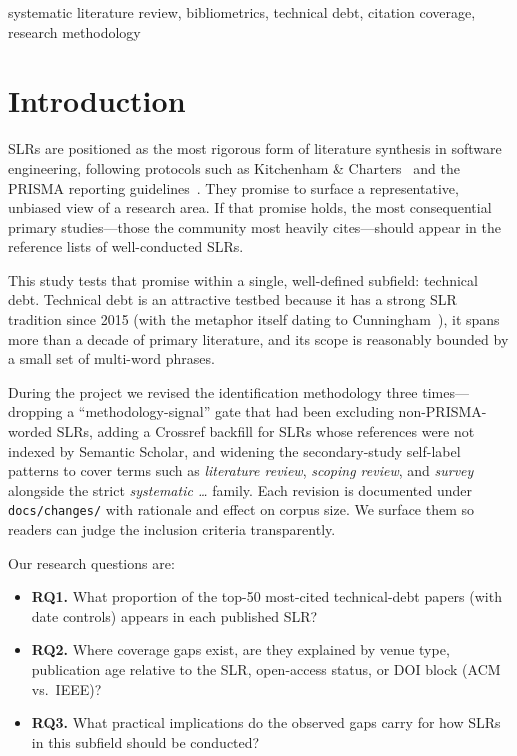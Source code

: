 \documentclass[conference]{IEEEtran}
\begin{document}
\begin{IEEEkeywords}
systematic literature review, bibliometrics, technical debt, citation
coverage, research methodology
\end{IEEEkeywords}

\section{Introduction}

SLRs are positioned as the most rigorous form of literature synthesis in
software engineering, following protocols such as Kitchenham \&
Charters~\cite{kitchenham2007guidelines} and the PRISMA reporting
guidelines~\cite{moher2009prisma}. They promise to surface a representative,
unbiased view of a research area. If that promise holds, the most
consequential primary studies---those the community most heavily
cites---should appear in the reference lists of well-conducted SLRs.

This study tests that promise within a single, well-defined subfield:
technical debt. Technical debt is an attractive testbed because it has a
strong SLR tradition since 2015 (with the metaphor itself dating to
Cunningham~\cite{cunningham1992wycash}), it spans more than a decade of
primary literature, and its scope is reasonably bounded by a small set of
multi-word phrases.

During the project we revised the identification methodology three
times---dropping a ``methodology-signal'' gate that had been excluding
non-PRISMA-worded SLRs, adding a Crossref backfill for SLRs whose
references were not indexed by Semantic Scholar, and widening the
secondary-study self-label patterns to cover terms such as \emph{literature
review}, \emph{scoping review}, and \emph{survey} alongside the strict
\emph{systematic \ldots} family. Each revision is documented under
\texttt{docs/changes/} with rationale and effect on corpus size. We surface
them so readers can judge the inclusion criteria transparently.

Our research questions are:

\begin{itemize}
  \item \textbf{RQ1.} What proportion of the top-50 most-cited
        technical-debt papers (with date controls) appears in each published
        SLR?
  \item \textbf{RQ2.} Where coverage gaps exist, are they explained by
        venue type, publication age relative to the SLR, open-access
        status, or DOI block (ACM vs.\ IEEE)?
  \item \textbf{RQ3.} What practical implications do the observed gaps
        carry for how SLRs in this subfield should be conducted?
\end{itemize}
\end{document}
